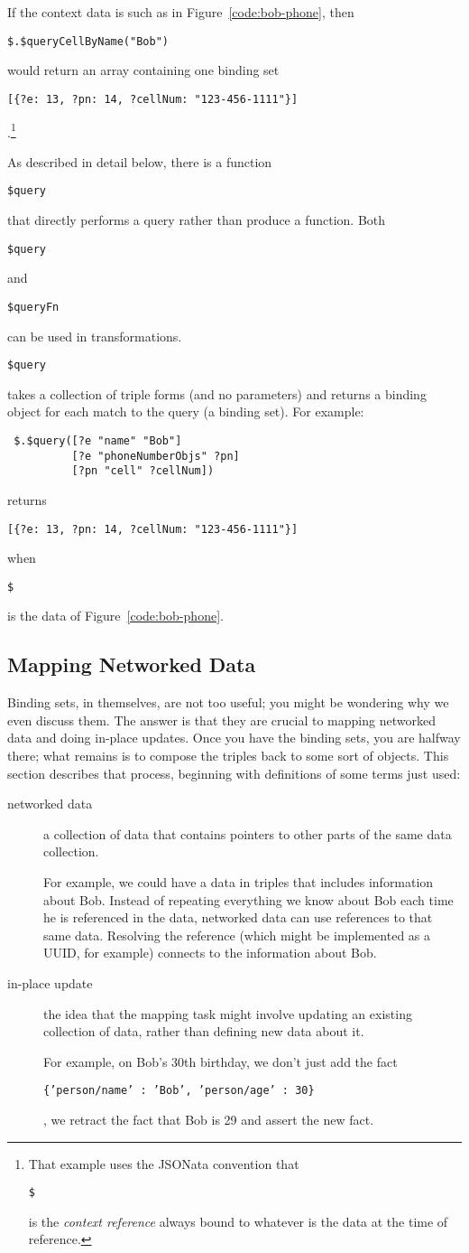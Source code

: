 \documentclass[9pt,letterpaper]{article}
\newcommand{\stt}[1]{\begin{footnotesize}\texttt{#1}\end{footnotesize}}
\begin{document}
If the context data is such as in Figure~\ref{code:bob-phone}, then \stt{\$.\$queryCellByName("Bob")} would return an array containing one binding set \stt{[\{?e: 13, ?pn: 14, ?cellNum: "123-456-1111"\}]}.\footnote{That
example uses the JSONata convention that \stt{\$} is the \textit{context reference} always bound to whatever is the data at the time of reference.}

As described in detail below, there is a function \stt{\$query} that directly performs a query rather than produce a function.
Both \stt{\$query} and \stt{\$queryFn} can be used in transformations.
\stt{\$query} takes a collection of triple forms (and no parameters) and returns a binding object for each match to the query (a binding set).
For example:

\begin{lstlisting}
 $.$query([?e "name" "Bob"]
          [?e "phoneNumberObjs" ?pn]
          [?pn "cell" ?cellNum])
\end{lstlisting}

returns \stt{[\{?e: 13, ?pn: 14, ?cellNum: "123-456-1111"\}]} when \stt{\$} is the data of Figure~\ref{code:bob-phone}.

\subsection{Mapping  Networked Data}

Binding sets, in themselves, are not too useful; you might be wondering why we even discuss them.
The answer is that they are crucial to mapping networked data and doing in-place updates.
Once you have the binding sets, you are halfway there; what remains is to compose the triples back to some sort of objects.
This section describes that process, beginning with definitions of some terms just used:

\begin{description}
\item[networked data] a collection of data that contains pointers to other parts of the same data collection.

  For example, we could have a data in triples that includes information about Bob.
  Instead of repeating everything we know about Bob each time he is referenced in the data,
  networked data can use references to that same data.
  Resolving the reference (which might be implemented as a UUID, for example) connects to the information about Bob.
\item[in-place update] the idea that the mapping task might involve updating an existing collection of data, rather than
  defining new data about it.

  For example, on Bob's 30th birthday, we don't just add the fact \stt{\{'person/name' : 'Bob', 'person/age' : 30\}}, we
  retract the fact that Bob is 29 and assert the new fact.
\end{description}
\end{document}
